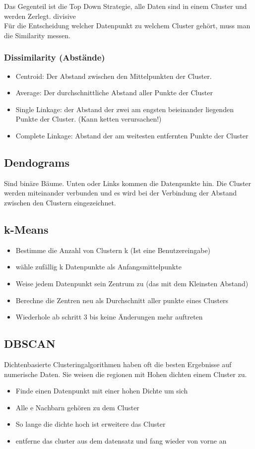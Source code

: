 \documentclass[a4paper]{scrartcl}
\begin{document}
Das Gegenteil ist die Top Down Strategie, alle Daten sind in einem Cluster und werden Zerlegt. divisive\\

Für die Entscheidung welcher Datenpunkt zu welchem Cluster gehört, muss man die Similarity messen.

\subsubsection{Dissimilarity (Abstände)}
\begin{itemize}
\item Centroid: Der Abstand zwischen den Mittelpunkten der Cluster.
\item Average: Der durchschnittliche Abstand aller Punkte der Cluster
\item Single Linkage: der Abstand der zwei am engsten beieinander liegenden Punkte der Cluster. (Kann ketten verursachen!)
\item Complete Linkage: Abstand der am weitesten entfernten Punkte der Cluster
\end{itemize}
\subsection{Dendograms}
Sind binäre Bäume. Unten oder Links kommen die Datenpunkte hin. Die Cluster werden miteinander verbunden und es wird bei der Verbindung der Abstand zwischen den Clustern eingezeichnet. 
\subsection{k-Means}
\begin{itemize}
\item Bestimme die Anzahl von Clustern k (Ist eine Benutzereingabe)
\item wähle zufällig k Datenpunkte als Anfangsmittelpunkte
\item Weise jedem Datenpunkt sein Zentrum zu (das mit dem Kleinsten Abstand)
\item Berechne die Zentren neu als Durchschnitt aller punkte eines Clusters
\item Wiederhole ab schritt 3 bis keine Änderungen mehr auftreten
\end{itemize} 
\subsection{DBSCAN}
Dichtenbasierte Clusteringalgorithmen haben oft die besten Ergebnisse auf numerische Daten. Sie weisen die regionen mit Hohen dichten einem Cluster zu.
\begin{itemize}
\item Finde einen Datenpunkt mit einer hohen Dichte um sich
\item Alle e Nachbarn gehören zu dem Cluster
\item So lange die dichte hoch ist erweitere das Cluster
\item entferne das cluster aus dem datensatz und fang wieder von vorne an
\end{itemize}
\end{document}
